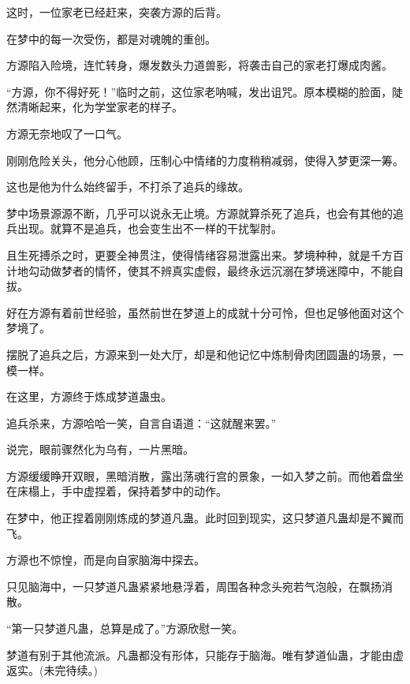 \begin{this_body}
这时，一位家老已经赶来，突袭方源的后背。

在梦中的每一次受伤，都是对魂魄的重创。

方源陷入险境，连忙转身，爆发数头力道兽影，将袭击自己的家老打爆成肉酱。

“方源，你不得好死！”临时之前，这位家老呐喊，发出诅咒。原本模糊的脸面，陡然清晰起来，化为学堂家老的样子。

方源无奈地叹了一口气。

刚刚危险关头，他分心他顾，压制心中情绪的力度稍稍减弱，使得入梦更深一筹。

这也是他为什么始终留手，不打杀了追兵的缘故。

梦中场景源源不断，几乎可以说永无止境。方源就算杀死了追兵，也会有其他的追兵出现。就算不是追兵，也会变生出不一样的干扰掣肘。

且生死搏杀之时，更要全神贯注，使得情绪容易泄露出来。梦境种种，就是千方百计地勾动做梦者的情怀，使其不辨真实虚假，最终永远沉溺在梦境迷障中，不能自拔。

好在方源有着前世经验，虽然前世在梦道上的成就十分可怜，但也足够他面对这个梦境了。

摆脱了追兵之后，方源来到一处大厅，却是和他记忆中炼制骨肉团圆蛊的场景，一模一样。

在这里，方源终于炼成梦道蛊虫。

追兵杀来，方源哈哈一笑，自言自语道：“这就醒来罢。”

说完，眼前骤然化为乌有，一片黑暗。

方源缓缓睁开双眼，黑暗消散，露出荡魂行宫的景象，一如入梦之前。而他着盘坐在床榻上，手中虚捏着，保持着梦中的动作。

在梦中，他正捏着刚刚炼成的梦道凡蛊。此时回到现实，这只梦道凡蛊却是不翼而飞。

方源也不惊惶，而是向自家脑海中探去。

只见脑海中，一只梦道凡蛊紧紧地悬浮着，周围各种念头宛若气泡般，在飘扬消散。

“第一只梦道凡蛊，总算是成了。”方源欣慰一笑。

梦道有别于其他流派。凡蛊都没有形体，只能存于脑海。唯有梦道仙蛊，才能由虚返实。(未完待续。)

\end{this_body}

